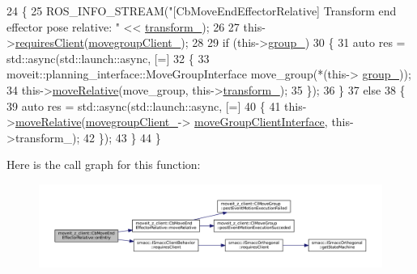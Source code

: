 \begin{DoxyCode}
24 \{
25     ROS\_INFO\_STREAM(\textcolor{stringliteral}{"[CbMoveEndEffectorRelative] Transform end effector pose relative: "} << 
      \hyperlink{classmoveit__z__client_1_1CbMoveEndEffectorRelative_a0686340d0328df4d0ecb962b61026f43}{transform\_});
26 
27     this->\hyperlink{classsmacc_1_1ISmaccClientBehavior_a32b16e99e3b4cb289414203dc861a440}{requiresClient}(\hyperlink{classmoveit__z__client_1_1CbMoveEndEffectorRelative_a5f009b3baaaa47ad3be09d43bab33c07}{movegroupClient\_});
28 
29     \textcolor{keywordflow}{if} (this->\hyperlink{classmoveit__z__client_1_1CbMoveEndEffectorRelative_a143fdce14603f8c78aae258b605ff607}{group\_})
30     \{
31         \textcolor{keyword}{auto} res = std::async(std::launch::async, [=] 
32         \{
33                 moveit::planning\_interface::MoveGroupInterface move\_group(*(this->
      \hyperlink{classmoveit__z__client_1_1CbMoveEndEffectorRelative_a143fdce14603f8c78aae258b605ff607}{group\_}));
34                 this->\hyperlink{classmoveit__z__client_1_1CbMoveEndEffectorRelative_ae80ce575678a1f602d2fc1f68df1813f}{moveRelative}(move\_group, this->\hyperlink{classmoveit__z__client_1_1CbMoveEndEffectorRelative_a0686340d0328df4d0ecb962b61026f43}{transform\_});
35         \});
36     \}
37     \textcolor{keywordflow}{else}
38     \{
39         \textcolor{keyword}{auto} res = std::async(std::launch::async, [=] 
40         \{
41             this->\hyperlink{classmoveit__z__client_1_1CbMoveEndEffectorRelative_ae80ce575678a1f602d2fc1f68df1813f}{moveRelative}(\hyperlink{classmoveit__z__client_1_1CbMoveEndEffectorRelative_a5f009b3baaaa47ad3be09d43bab33c07}{movegroupClient\_}->
      \hyperlink{classmoveit__z__client_1_1ClMoveGroup_af86e046b837be0ef4afa9893d8808f20}{moveGroupClientInterface}, this->transform\_);
42         \});
43     \}
44 \}
\end{DoxyCode}
Here is the call graph for this function\+:
\nopagebreak
\begin{figure}[H]
\begin{center}
\leavevmode
\includegraphics[width=350pt]{classmoveit__z__client_1_1CbMoveEndEffectorRelative_ae425a51d23933a13a87df9cd26f0fc99_cgraph}
\end{center}
\end{figure}
\mbox{\label{classmoveit__z__client_1_1CbMoveEndEffectorRelative_af23c69f0919a2f62fbddf0e1dbdb83e1}} 
